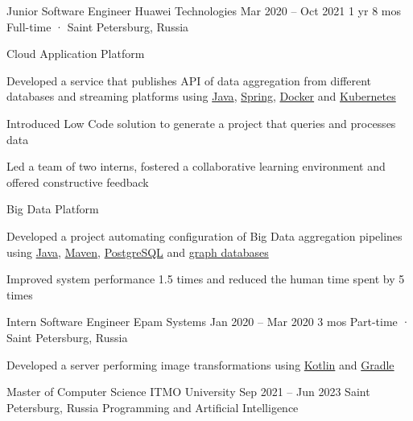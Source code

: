 \documentclass[11pt, a4paper]{style}
\begin{document}
\begin{paracol}{2}
    \cvEntry
        {Junior Software Engineer} {Huawei Technologies}
        {Mar 2020 -- Oct 2021} {1 yr 8 mos}
        {Full-time · Saint Petersburg, Russia}
        {
            Cloud Application Platform \\
            \vspace{-5mm}
            \begin{cvItems}
                \item Developed a service that publishes API of data aggregation from different databases and streaming platforms using \underline{Java}, \underline{Spring}, \underline{Docker} and \underline{Kubernetes}
                \item Introduced Low Code solution to generate a project that queries and processes data
                \item Led a team of two interns, fostered a collaborative learning environment and offered constructive feedback
            \end{cvItems}
            \vspace{-1mm}
            Big Data Platform \\
            \vspace{-5mm}
            \begin{cvItems}
                \item Developed a project automating configuration of Big Data aggregation pipelines using \underline{Java}, \underline{Maven}, \underline{PostgreSQL} and \underline{graph databases}
                \item Improved system performance 1.5 times and reduced the human time spent by 5 times
            \end{cvItems}
        }

    \cvEntry
        {Intern Software Engineer} {Epam Systems}
        {Jan 2020 -- Mar 2020} {3 mos}
        {Part-time · Saint Petersburg, Russia}
        {
            \begin{cvItems}
                \item Developed a server performing image transformations using \underline{Kotlin} and \underline{Gradle}
            \end{cvItems}
        }



    \cvEntry
        {Master of Computer Science} {ITMO University}
        {Sep 2021 -- Jun 2023} {}
        {Saint Petersburg, Russia}
        {
            \vspace{-1mm}
            Programming and Artificial Intelligence
        }


\end{paracol}
\end{document}
